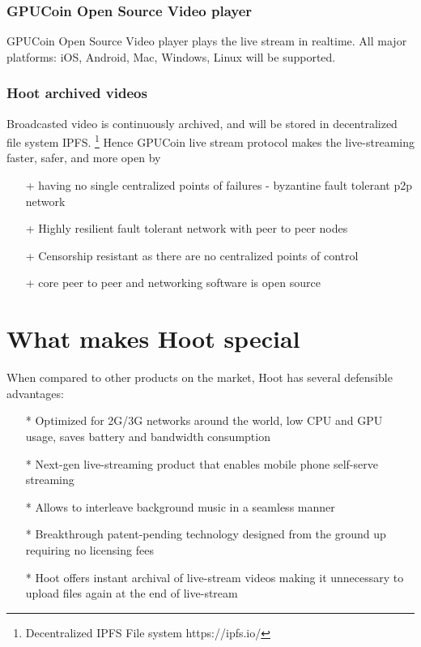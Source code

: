 \documentclass{article}
\begin{document}
\subsubsection{GPUCoin Open Source Video player}
GPUCoin Open Source Video player plays the live stream in realtime. All major platforms: iOS, Android, Mac, Windows, Linux will be supported.

\subsubsection{Hoot archived videos}
Broadcasted video is continuously archived, and will be stored in decentralized file system IPFS. \footnote{Decentralized IPFS File system https://ipfs.io/} Hence GPUCoin live stream protocol makes the live-streaming faster, safer, and more open by
\begin{itemize}
 \item[+]having no single centralized points of failures - byzantine fault tolerant p2p network
 \item[+]Highly resilient fault tolerant network with peer to peer nodes
 \item[+]Censorship resistant as there are no centralized points of control
 \item[+]core peer to peer and networking software is open source
\end{itemize}

\section{What makes Hoot special}
When compared to other products on the market, Hoot has several defensible advantages:
\begin{itemize}
\item[*]Optimized for 2G/3G networks around the world, low CPU and GPU usage, saves battery and bandwidth consumption
\item[*]Next-gen live-streaming product that enables mobile phone self-serve streaming 
\item[*]Allows to interleave background music in a seamless manner
\item[*]Breakthrough patent-pending technology designed from the ground up requiring no licensing fees
\item[*]Hoot offers instant archival of live-stream videos making it unnecessary to upload files again at the end of live-stream

\end{itemize}
\end{document}
